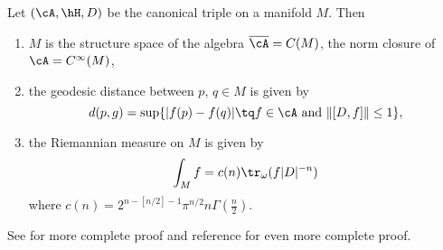 \begin{theorem}
Let $(\cA,\hH,D)$ be the canonical triple on a manifold $M$. Then
\begin{enumerate}
\item $M$ is the structure space of the algebra $\overline{ \cA }=C(M)$, the norm closure of $\cA= C^{\infty}(M)$,
\item the geodesic distance between $p$, $q\in M$ is given by
\begin{equation} \label{eq_defdtriple}
  d(p,g)=\sup\{ | f(p)-f(q) |\tq f\in\cA\text{ and }\| [D,f] \|\leq 1 \},
\end{equation}
\item the Riemannian measure on $M$ is given by
\begin{equation}
\int_M f=c(n)\tr_{\omega}(f| D |^{-n})
\end{equation}
where $c(n)=2^{n-[n/2]-1}\pi^{n/2}n\Gamma(\frac{ n }{2})$.
\end{enumerate}

\end{theorem}

See \cite{Landi} for more complete proof and reference for even more complete proof.

